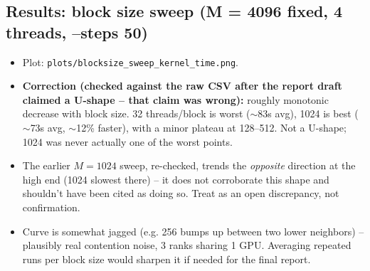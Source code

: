 \subsection{Results: block size sweep (M = 4096 fixed, 4 threads, --steps 50)}
\begin{itemize}
\item Plot: \texttt{plots/blocksize\_sweep\_kernel\_time.png}.
\item \textbf{Correction (checked against the raw CSV after the report draft claimed a U-shape -- that claim was wrong):} roughly monotonic decrease with block size. 32 threads/block is worst ($\sim$83s avg), 1024 is best ($\sim$73s avg, $\sim$12\% faster), with a minor plateau at 128--512. Not a U-shape; 1024 was never actually one of the worst points.
\item The earlier $M=1024$ sweep, re-checked, trends the \emph{opposite} direction at the high end (1024 slowest there) -- it does not corroborate this shape and shouldn't have been cited as doing so. Treat as an open discrepancy, not confirmation.
\item Curve is somewhat jagged (e.g. 256 bumps up between two lower neighbors) -- plausibly real contention noise, 3 ranks sharing 1 GPU. Averaging repeated runs per block size would sharpen it if needed for the final report.
\end{itemize}

